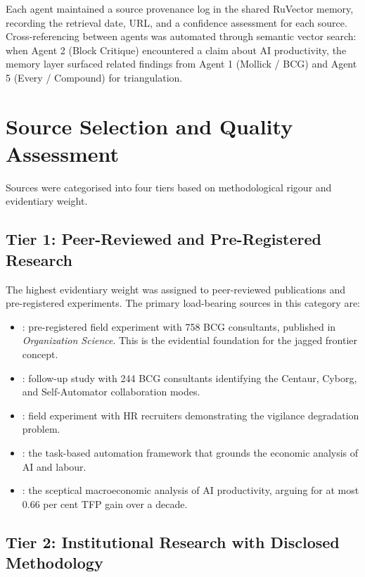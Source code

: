 Each agent maintained a source provenance log in the shared RuVector memory, recording the retrieval date, URL, and a confidence assessment for each source. Cross-referencing between agents was automated through semantic vector search: when Agent 2 (Block Critique) encountered a claim about AI productivity, the memory layer surfaced related findings from Agent 1 (Mollick / BCG) and Agent 5 (Every / Compound) for triangulation.

\section{Source Selection and Quality Assessment}

Sources were categorised into four tiers based on methodological rigour and evidentiary weight.

\subsection{Tier 1: Peer-Reviewed and Pre-Registered Research}

The highest evidentiary weight was assigned to peer-reviewed publications and pre-registered experiments. The primary load-bearing sources in this category are:

\begin{itemize}
  \item \textcite{DellAcqua2026}: pre-registered field experiment with 758 BCG consultants, published in \emph{Organization Science}. This is the evidential foundation for the jagged frontier concept.
  \item \textcite{Randazzo2024}: follow-up study with 244 BCG consultants identifying the Centaur, Cyborg, and Self-Automator collaboration modes.
  \item \textcite{DellAcqua2023}: field experiment with HR recruiters demonstrating the vigilance degradation problem.
  \item \textcite{Acemoglu2019}: the task-based automation framework that grounds the economic analysis of AI and labour.
  \item \textcite{Acemoglu2025}: the sceptical macroeconomic analysis of AI productivity, arguing for at most 0.66 per cent TFP gain over a decade.
\end{itemize}

\subsection{Tier 2: Institutional Research with Disclosed Methodology}


